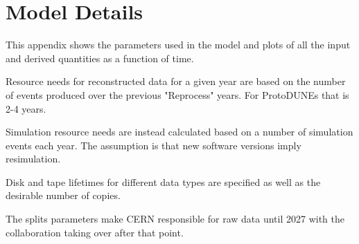 \documentclass[12pt]{article}
\begin{document}
%
%
%
%
%
%
%
\section{Model Details}

This appendix shows the parameters used in the model and plots of all the input and derived quantities as a function of time. 

Resource needs for reconstructed data for a given year are based on the number of events produced over the previous "Reprocess" years.   For ProtoDUNEs that is 2-4 years. 

Simulation resource needs are instead calculated based on a number of simulation events each year. The assumption is that new software versions imply resimulation.

Disk and tape lifetimes for different data types are specified as well as the desirable number of copies. 

The splits parameters make CERN responsible for raw data until 2027 with the collaboration taking over after that point. 


\end{document}
